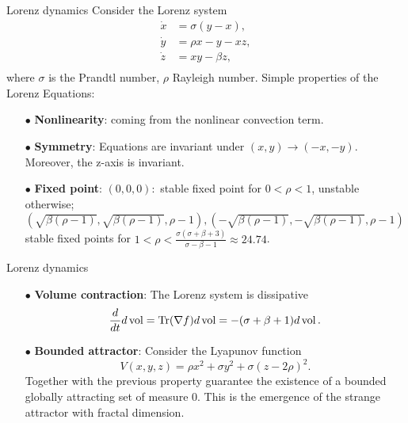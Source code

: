 \documentclass{beamer}
\begin{document}
\begin{frame}{Lorenz dynamics}
	Consider the Lorenz system
	\begin{equation}\label{equ:Lorenz}
		\begin{aligned}
			\dot{x} & = \sigma(y - x),		\\
			\dot{y} & = \rho x - y - xz,		\\
			\dot{z} & = xy - \beta z,		\\
		\end{aligned}
	\end{equation}
	where $\sigma$ is the Prandtl number, $\rho$ Rayleigh number. Simple properties of the Lorenz Equations\footnotemark:
	\begin{itemize}
		\item[$\bullet$] \textbf{Nonlinearity}: coming from the nonlinear convection term.
		\item[$\bullet$] \textbf{Symmetry}: Equations are invariant under $(x, y) \rightarrow (-x, -y)$. Moreover,
the z-axis is invariant.
		\item[$\bullet$] \textbf{Fixed point}: $(0, 0, 0):$ stable fixed point for $0 < \rho < 1$, unstable otherwise;
		$(\sqrt{\beta(\rho-1)}, \sqrt{\beta(\rho-1)}, \rho-1), (-\sqrt{\beta(\rho-1)}, -\sqrt{\beta(\rho-1)}, \rho-1)$
		stable fixed points for $1<\rho<\frac{\sigma(\sigma+\beta+3)}{\sigma-\beta-1}\approx 24.74$.
	\end{itemize}
\end{frame}

\begin{frame}{Lorenz dynamics}
	\begin{itemize}
		\item[$\bullet$] \textbf{Volume contraction}: The Lorenz system is dissipative
		\begin{equation}
			\frac{d}{dt}d\operatorname{vol} = \operatorname{Tr}(\nabla f)d\operatorname{vol} = -(\sigma + \beta + 1)d\operatorname{vol}.
		\end{equation}
		\item[$\bullet$] \textbf{Bounded attractor}: Consider the Lyapunov function 
		\begin{equation}
			V(x,y,z) = \rho x^2 + \sigma y^2 + \sigma(z-2\rho)^2.
		\end{equation}
		Together with the previous property guarantee the existence of a bounded globally attracting set 
		of measure $0$. This is the emergence of the strange attractor with fractal dimension.
	\end{itemize}
\end{frame}
\end{document}

